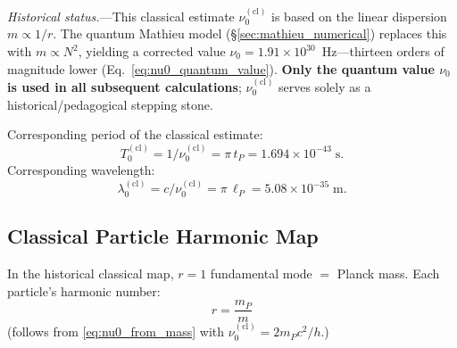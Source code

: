 \documentclass[11pt]{article}
\begin{document}
\textit{Historical status.}---This classical estimate
$\nu_0^{(\mathrm{cl})}$ is based on the linear
dispersion $m \propto 1/r$.  The quantum Mathieu model
(\S\ref{sec:mathieu_numerical}) replaces this with
$m \propto N^2$, yielding a corrected value
$\nu_0 = 1.91 \times 10^{30}$~Hz---thirteen orders of
magnitude lower (Eq.~\ref{eq:nu0_quantum_value}).
\textbf{Only the quantum value $\nu_0$ is used in all
subsequent calculations}; $\nu_0^{(\mathrm{cl})}$ serves
solely as a historical/pedagogical stepping stone.

Corresponding period of the classical estimate:
\begin{equation}
  T_0^{(\mathrm{cl})}
  = 1/\nu_0^{(\mathrm{cl})} = \pi\,t_P
  = 1.694 \times 10^{-43}\;\mathrm{s}.
\end{equation}
Corresponding wavelength:
\begin{equation}
  \lambda_0^{(\mathrm{cl})}
  = c/\nu_0^{(\mathrm{cl})} = \pi\,\ell_P
  = 5.08 \times 10^{-35}\;\mathrm{m}.
\end{equation}

\subsection{Classical Particle Harmonic Map}

In the historical classical map, $r = 1$ fundamental mode
$=$ Planck mass.
Each particle's harmonic number:
\begin{equation}
  r = \frac{m_P}{m}
  \label{eq:r_from_mass}
\end{equation}
(follows from \eqref{eq:nu0_from_mass}
with $\nu_0^{(\mathrm{cl})} = 2m_P c^2/h$.)
\end{document}
